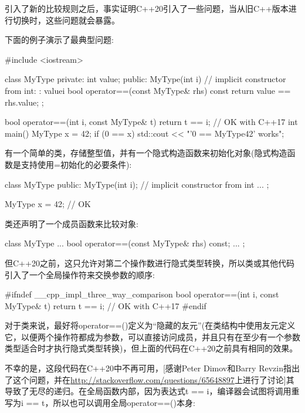 
引入了新的比较规则之后，事实证明C++20引入了一些问题，当从旧C++版本进行切换时，这些问题就会暴露。


下面的例子演示了最典型问题:


\begin{cpp}
#include <iostream>

class MyType {
private:
	int value;
public:
	MyType(int i) // implicit constructor from int:
		: value{i} {
	}
	bool operator==(const MyType& rhs) const {
		return value == rhs.value;
	}
};

bool operator==(int i, const MyType& t) {
	return t == i; // OK with C++17
}
int main()
{
	MyType x = 42;
	if (0 == x) {
		std::cout << "'0 == MyType{42}' works\n";
	}
}
\end{cpp}

有一个简单的类，存储整型值，并有一个隐式构造函数来初始化对象(隐式构造函数是支持使用=初始化的必要条件):

\begin{cpp}
class MyType {
	public:
	MyType(int i); // implicit constructor from int
	...
};

MyType x = 42; // OK
\end{cpp}

类还声明了一个成员函数来比较对象:

\begin{cpp}
class MyType {
	...
	bool operator==(const MyType& rhs) const;
	...
};
\end{cpp}

但C++20之前，这只允许对第二个操作数进行隐式类型转换，所以类或其他代码引入了一个全局操作符来交换参数的顺序:

\begin{cpp}
#ifndef __cpp_impl_three_way_comparison
bool operator==(int i, const MyType& t) {
  return t == i; // OK with C++17
}
#endif
\end{cpp}

对于类来说，最好将operator==()定义为“隐藏的友元”(在类结构中使用友元定义它，以便两个操作符都成为参数，可以直接访问成员，并且只有在至少有一个参数类型适合时才执行隐式类型转换)，但上面的代码在C++20之前具有相同的效果。

不幸的是，这段代码在C++20中不再可用，[感谢Peter Dimov和Barry Revzin指出了这个问题，并在\url{http://stackoverflow.com/questions/65648897}上进行了讨论]其导致了无尽的递归。在全局函数内部，因为表达式t == i，编译器会试图将调用重写为i == t，所以也可以调用全局operator==()本身:

